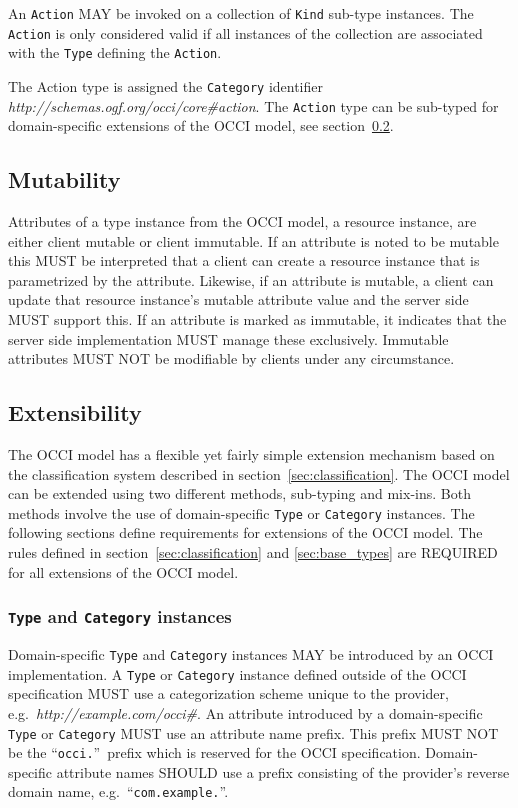 \documentclass[10pt,a4paper,british]{article}
\newcommand{\hl}{\texttt}
\begin{document}
An \hl{Action} MAY be invoked on a collection of \hl{Kind} sub-type instances.
The \hl{Action} is only considered valid if all instances of the collection are
associated with the \hl{Type} defining the \hl{Action}.

The Action type is assigned the \hl{Category} identifier
\textit{http://schemas.ogf.org/occi/core\#action}.
%
The \hl{Action} type can be sub-typed for domain-specific extensions of the
OCCI model, see section~\ref{sec:extensibility}.

\subsection{Mutability}
Attributes of a type instance from the OCCI model, a resource instance, are
either client mutable or client immutable. If an attribute is noted to
be mutable this MUST be interpreted that a client can create a
resource instance that is parametrized by the attribute. Likewise, if
an attribute is mutable, a client can update that resource instance's
mutable attribute value and the server side MUST support this. If an
attribute is marked as immutable, it indicates that the server side
implementation MUST manage these exclusively. Immutable attributes
MUST NOT be modifiable by clients under any circumstance.

\subsection{Extensibility}
\label{sec:extensibility}
The OCCI model has a flexible yet fairly simple extension mechanism based on
the classification system described in section~\ref{sec:classification}.
%
The OCCI model can be extended using two different methods, sub-typing and
mix-ins. Both methods involve the use of domain-specific \hl{Type} or
\hl{Category} instances. The following sections define requirements for
extensions of the OCCI model.
%
The rules defined in section~\ref{sec:classification} and \ref{sec:base_types}
are REQUIRED for all extensions of the OCCI model.

\subsubsection{\hl{Type} and \hl{Category} instances}
\label{sec:ext:category}
Domain-specific \hl{Type} and \hl{Category} instances MAY be introduced by an
OCCI implementation.
%
A \hl{Type} or \hl{Category} instance defined outside of the OCCI
specification MUST use a categorization scheme unique to the provider,
e.g.~\textit{http://example.com/occi\#}.
%
An attribute introduced by a domain-specific \hl{Type} or \hl{Category} MUST
use an attribute name prefix. This prefix MUST NOT be the ``\texttt{occi.}''~prefix
which is reserved for the OCCI specification. Domain-specific attribute names
SHOULD use a prefix consisting of the provider's reverse domain name,
e.g.~``\texttt{com.example.}''.
\end{document}
